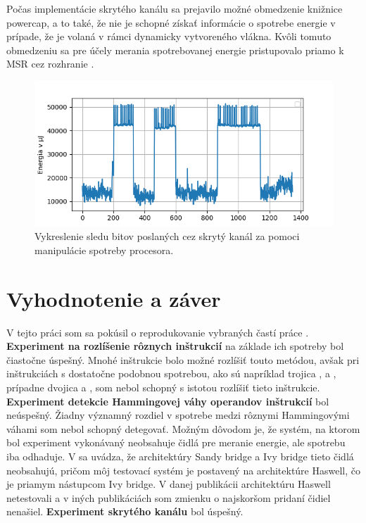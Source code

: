 Počas implementácie skrytého kanálu sa prejavilo možné obmedzenie knižnice powercap, a to také, že nie je schopné získať informácie o spotrebe energie v prípade,
že je volaná v rámci dynamicky vytvoreného vlákna. Kvôli tomuto obmedzeniu sa pre účely merania spotrebovanej energie pristupovalo priamo k MSR cez
rozhranie .

\begin{figure}\label{img:covert_channel}
  \centering
  \includegraphics[scale=0.7]{./obrazky-figures/covert_channel.png}
  \caption{Vykreslenie sledu bitov  poslaných cez skrytý kanál za pomoci manipulácie spotreby procesora.}
\end{figure}

\section{Vyhodnotenie a záver}
V tejto práci som sa pokúsil o reprodukovanie vybraných častí práce \cite{Platypus}. \textbf{Experiment na rozlíšenie rôznych inštrukcií} na základe ich spotreby bol
čiastočne úspešný. Mnohé inštrukcie bolo možné rozlíšiť touto metódou, avšak pri inštrukciách s dostatočne podobnou spotrebou, ako sú napríklad trojica ,
 a , prípadne dvojica  a , som nebol schopný s istotou rozlíšiť tieto inštrukcie.
\textbf{Experiment detekcie Hammingovej váhy operandov inštrukcií} bol neúspešný. Žiadny významný rozdiel v spotrebe medzi rôznymi Hammingovými váhami som nebol schopný
detegovať. Možným dôvodom je, že systém, na ktorom bol experiment vykonávaný neobsahuje čidlá pre meranie energie, ale spotrebu iba odhaduje.
V \cite{Platypus} sa uvádza, že architektúry Sandy bridge a Ivy bridge tieto čidlá neobsahujú, pričom môj testovací systém je postavený
na architektúre Haswell, čo je priamym nástupcom Ivy bridge. V danej publikácii architektúru Haswell netestovali a v iných publikáciách som
zmienku o najskoršom pridaní čidiel nenašiel. \textbf{Experiment skrytého kanálu} bol úspešný.

